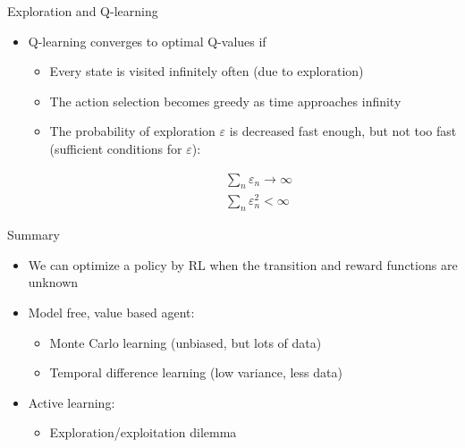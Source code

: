 \documentclass[11pt,table]{beamer}
\begin{document}
\begin{frame}{Exploration and Q-learning}


\begin{itemize}
    \item Q-learning converges to optimal Q-values if
\begin{itemize}
    \item Every state is visited infinitely often (due to exploration)
\item The action selection becomes greedy as time  approaches infinity
 \item The probability of exploration $\varepsilon$ is decreased fast enough, but not too fast (sufficient conditions for $\varepsilon$):

\vspace{5mm}
\begin{align}
&  \sum_{n} \varepsilon_{n} \rightarrow \infty \\
& \sum_{n} \varepsilon^2_{n} < \infty
\end{align}

\end{itemize} 
\end{itemize}
\end{frame}

\begin{frame}{Summary}


\begin{itemize}
    \item We can optimize a policy by RL when the  transition and reward functions are unknown

\item \textcolor{red1}{Model free, value based agent}:

\begin{itemize}
\item Monte Carlo learning (unbiased, but lots of data)
\item Temporal difference learning (low variance, less data)
 
\end{itemize}
 \item Active learning:
\begin{itemize}
    \item Exploration/exploitation dilemma
 
\end{itemize} 
\end{itemize}
    
\end{frame}
\end{document}
